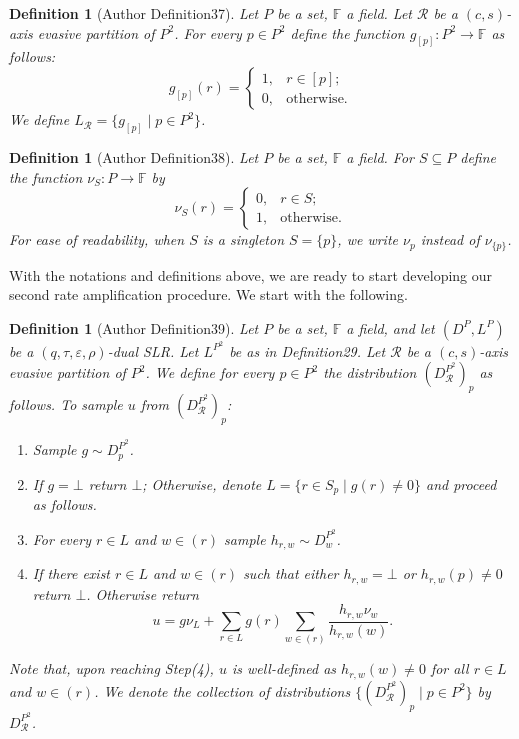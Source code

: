 \documentclass[10pt,a4paper]{article}
\newtheorem{ntdefinition}[nttheorem]{Definition}
\begin{document}
\begin{ntdefinition}[Author Definition37]
Let $P$ be a set, $\mathbb F$ a field. Let $\mathcal R$ be a $(c,s)$-axis evasive partition of $P^2$. For every $p\in P^2$ define the function $g_{[p]}:P^2\to\mathbb F$ as follows:
\[g_{[p]}(r)=\begin{cases}1,&r\in[p];\\0,&\text{otherwise}.\end{cases}\]
We define $L_{\mathcal R}=\{g_{[p]}\mid p\in P^2\}$.
\end{ntdefinition}
\begin{ntdefinition}[Author Definition38]
Let $P$ be a set, $\mathbb F$ a field. For $S\subseteq P$ define the function $\nu_S:P\to\mathbb F$ by
\[\nu_S(r)=\begin{cases}0,&r\in S;\\1,&\text{otherwise}.\end{cases}\]
For ease of readability, when $S$ is a singleton $S=\{p\}$, we write $\nu_p$ instead of $\nu_{\{p\}}$.
\end{ntdefinition}
With the notations and definitions above, we are ready to start developing our second rate amplification procedure. We start with the following.
\begin{ntdefinition}[Author Definition39]
Let $P$ be a set, $\mathbb F$ a field, and let $(D^P,L^P)$ be a $(q,\tau,\varepsilon,\rho)$-dual SLR. Let $L^{P^2}$ be as in Definition29. Let $\mathcal R$ be a $(c,s)$-axis evasive partition of $P^2$. We define for every $p\in P^2$ the distribution $(D_{\mathcal R}^{P^2})_p$ as follows. To sample $u$ from $(D_{\mathcal R}^{P^2})_p$:
\begin{enumerate}
\item Sample $g\sim D_p^{P^2}$.
\item If $g=\bot$ return $\bot$; Otherwise, denote $L=\{r\in S_p\mid g(r)\ne0\}$ and proceed as follows.
\item For every $r\in L$ and $w\in(r)$ sample $h_{r,w}\sim D_w^{P^2}$.
\item If there exist $r\in L$ and $w\in(r)$ such that either $h_{r,w}=\bot$ or $h_{r,w}(p)\ne0$ return $\bot$. Otherwise return
\begin{equation}u=g\nu_L+\sum_{r\in L}g(r)\sum_{w\in(r)}\frac{h_{r,w}\nu_w}{h_{r,w}(w)}.\tag{4.3}\end{equation}
\end{enumerate}
Note that, upon reaching Step(4), $u$ is well-defined as $h_{r,w}(w)\ne0$ for all $r\in L$ and $w\in(r)$. We denote the collection of distributions $\{(D_{\mathcal R}^{P^2})_p\mid p\in P^2\}$ by $D_{\mathcal R}^{P^2}$.
\end{ntdefinition}
\end{document}
